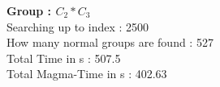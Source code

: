 \textbf{Group : $C_2*C_3$}\\
Searching up to index : 2500\\
How many normal groups are found : 527\\
Total Time in s : 507.5\\
Total Magma-Time in s : 402.63\\
